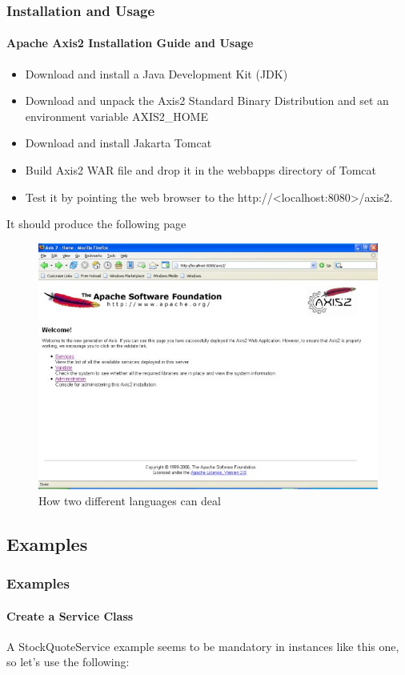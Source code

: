 \documentclass{beamer}
\begin{document}
\begin{frame}
\frametitle{Installation and Usage}
\framesubtitle{Apache Axis2 Installation Guide and Usage}

\begin{itemize}
  \item Download and install a Java Development Kit (JDK)
  \item Download and unpack the Axis2 Standard Binary 
  Distribution and set an environment variable AXIS2\_HOME
  \item Download and install Jakarta Tomcat
  \item Build Axis2 WAR file and drop it in the webbapps 
  directory of Tomcat
  \item Test it by pointing the web browser to the http://<localhost:8080>/axis2.
\end{itemize}

It should produce the following page
\begin{figure}
\centering
\includegraphics[scale=0.3]{../pics/axis2install.jpg}
\caption{How two different languages can deal}
\label{overflow}
\end{figure}

\end{frame}

\subsection[Short First Subsection Name]{Examples }

\begin{frame}
\frametitle{Examples}
\framesubtitle{Create a Service Class}
A StockQuoteService example seems to be mandatory in instances 
like this one, so let's use the following:

\end{frame}
\end{document}
